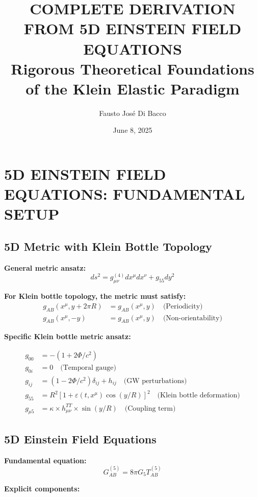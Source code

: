 \documentclass[12pt,a4paper]{article}
\title{\Large \textbf{COMPLETE DERIVATION FROM 5D EINSTEIN FIELD EQUATIONS}\\
\large Rigorous Theoretical Foundations of the Klein Elastic Paradigm}
\author{Fausto José Di Bacco}
\date{June 8, 2025}
\begin{document}
\maketitle

\section{5D EINSTEIN FIELD EQUATIONS: FUNDAMENTAL SETUP}

\subsection{5D Metric with Klein Bottle Topology}

\textbf{General metric ansatz:}
\begin{equation}
ds^2 = g_{\mu\nu}^{(4)} dx^\mu dx^\nu + g_{55} dy^2
\end{equation}

\textbf{For Klein bottle topology, the metric must satisfy:}
\begin{align}
g_{AB}(x^\mu, y + 2\pi R) &= g_{AB}(x^\mu, y) \quad \text{(Periodicity)}\\
g_{AB}(x^\mu, -y) &= g_{AB}(x^\mu, y) \quad \text{(Non-orientability)}
\end{align}

\textbf{Specific Klein bottle metric ansatz:}

\begin{align}
g_{00} &= -(1 + 2\Phi/c^2)\\
g_{0i} &= 0 \quad \text{(Temporal gauge)}\\
g_{ij} &= (1 - 2\Phi/c^2)\delta_{ij} + h_{ij} \quad \text{(GW perturbations)}\\
g_{55} &= R^2[1 + \varepsilon(t,x^\mu)\cos(y/R)]^2 \quad \text{(Klein bottle deformation)}\\
g_{\mu 5} &= \kappa \times h_{\mu\nu}^{TT} \times \sin(y/R) \quad \text{(Coupling term)}
\end{align}

\subsection{5D Einstein Field Equations}

\textbf{Fundamental equation:}
\begin{equation}
G_{AB}^{(5)} = 8\pi G_5 T_{AB}^{(5)}
\end{equation}

\textbf{Explicit components:}
\end{document}
